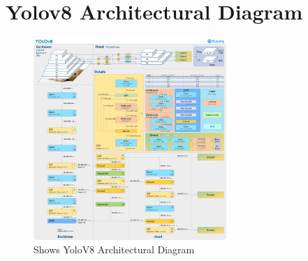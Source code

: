 \documentclass[12 pt]{report}
\begin{document}
\section{Yolov8 Architectural Diagram}
\begin{figure}[h]
  \centering
  \includegraphics[width=0.65\textwidth]{Yolov8_Arch.png}%
  \caption{Shows YoloV8 Architectural Diagram}
  \label{fig:function_block_diagram}
\end{figure}
\end{document}
